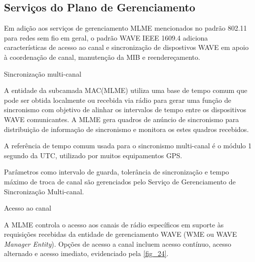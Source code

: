 \documentclass[
12pt,				%
openright,			%
oneside,			%
a4paper,			%
brazil,				%
]{abntex2}
\begin{document}
	\subsection{Serviços do Plano de Gerenciamento}
	
	\par Em adição aos serviços de gerenciamento MLME mencionados no padrão 802.11 para redes sem fio em geral, o padrão WAVE IEEE 1609.4 adiciona características de acesso ao canal e sincronização de dispostivos WAVE em apoio à coordenação de canal, manutenção da MIB e reendereçamento.
		
	\newpage
	
	\begin{description}
        \item[Sincronização multi-canal]
    \end{description} 
	
	\par A entidade da subcamada MAC(MLME) utiliza uma base de tempo comum que pode ser obtida localmente ou recebida via rádio para gerar uma função de sincronismo com objetivo de alinhar os intervalos de tempo entre os dispositivos WAVE comunicantes. A MLME gera quadros de anúncio de sincronismo para distribuição de informação de sincronismo e monitora os estes quadros recebidos.
	
	\par A referência de tempo comum usada para o sincronismo multi-canal é o módulo 1 segundo da UTC, utilizado por muitos equipamentos GPS.
	
	\par Parâmetros como intervalo de guarda, tolerância de sincronização e tempo máximo de troca de canal são gerenciados pelo Serviço de Gerenciamento de Sincronização Multi-canal.
	
	
	\begin{description}
        \item[Acesso ao canal]
    \end{description}
	
	\par A MLME controla o acesso aos canais de rádio específicos em suporte às requisições recebidas da entidade de gerenciamento WAVE (WME ou WAVE \textit{Manager Entity}). Opções de acesso a canal incluem acesso contínuo, acesso alternado e acesso imediato, evidenciado pela \autoref{fig_24}.
	
\end{document}
